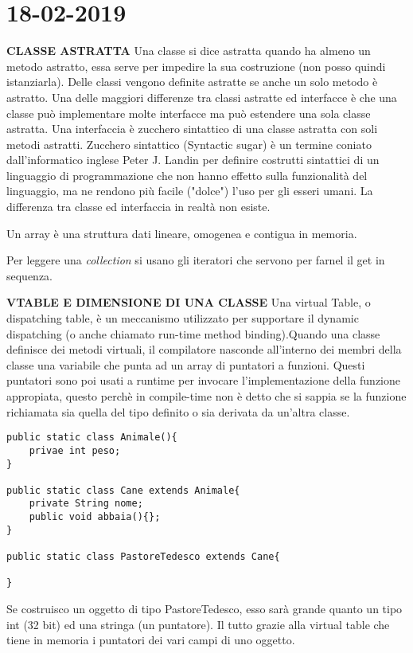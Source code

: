 
\newpage
\section{18-02-2019}
\textbf{CLASSE ASTRATTA} \newline
Una classe si dice astratta quando ha almeno un metodo astratto, essa serve per impedire la sua costruzione (non posso quindi istanziarla). Delle classi vengono definite astratte se anche un solo metodo è astratto. Una delle maggiori differenze tra classi astratte ed interfacce è che una classe può implementare molte interfacce ma può estendere una sola classe astratta. Una interfaccia è zucchero sintattico di una classe astratta con soli metodi astratti. Zucchero sintattico (Syntactic sugar) è un termine coniato dall'informatico inglese Peter J. Landin per definire costrutti sintattici di un linguaggio di programmazione che non hanno effetto sulla funzionalità del linguaggio, ma ne rendono più facile ("dolce") l'uso per gli esseri umani. La differenza tra classe ed interfaccia in realtà non esiste.

\noindent Un array è una struttura dati lineare, omogenea e contigua in memoria.

\noindent Per leggere una \textit{collection} si usano gli iteratori che servono per farnel il get in sequenza.

\noindent \textbf{VTABLE E DIMENSIONE DI UNA CLASSE} \newline
Una virtual Table, o dispatching table, è un meccanismo utilizzato per supportare il dynamic dispatching (o anche chiamato run-time method binding).Quando una classe definisce dei metodi virtuali, il compilatore nasconde all'interno dei membri della classe una variabile che punta ad un array di puntatori a funzioni. Questi puntatori sono poi usati a runtime per invocare l'implementazione della funzione appropiata, questo perchè in compile-time non è detto che si sappia se la funzione richiamata sia quella del tipo definito o sia derivata da un'altra classe.

\begin{lstlisting}[basicstyle=\small,]
public static class Animale(){
	privae int peso;
}

public static class Cane extends Animale{
	private String nome;
	public void abbaia(){};
}

public static class PastoreTedesco extends Cane{

}
\end{lstlisting}
Se costruisco un oggetto di tipo PastoreTedesco, esso sarà grande quanto un tipo int (32 bit) ed una stringa (un puntatore).
Il tutto grazie alla virtual table che tiene in memoria i puntatori dei vari campi di uno oggetto.






